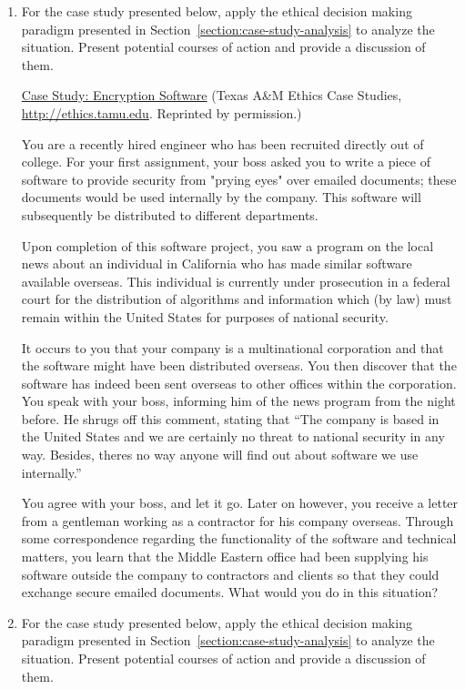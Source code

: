 \begin{enumerate}
\item
  For the case study presented below, apply the ethical decision making
  paradigm presented in Section~\ref{section:case-study-analysis} 
	to analyze the situation. Present
  potential courses of action and provide a discussion of them.



\begin{example}{\ul{Case Study: Encryption Software} (Texas A\&M Ethics Case Studies,
\url{http://ethics.tamu.edu}. Reprinted by permission.)}
\label{example:ethicsProblemsEncryptionSoftware}

You are a recently hired engineer who has been recruited directly out of
college. For your first assignment, your boss asked you to write a piece
of software to provide security from "prying eyes" over e­mailed
documents; these documents would be used internally by the company. This
software will subsequently be distributed to different departments.

Upon completion of this software project, you saw a program on the local
news about an individual in California who has made similar software
available overseas. This individual is currently under prosecution in a
federal court for the distribution of algorithms and information which
(by law) must remain within the United States for purposes of national
security.

It occurs to you that your company is a multinational corporation and
that the software might have been distributed overseas. You then
discover that the software has indeed been sent overseas to other
offices within the corporation. You speak with your boss, informing him
of the news program from the night before. He shrugs off this comment,
stating that ``The company is based in the United States and we are
certainly no threat to national security in any way. Besides,
there\textquotesingle s no way anyone will find out about software we
use internally.''

You agree with your boss, and let it go. Later on however, you receive a
letter from a gentleman working as a contractor for his company
overseas. Through some correspondence regarding the functionality of the
software and technical matters, you learn that the Middle Eastern office
had been supplying his software outside the company to contractors and
clients so that they could exchange secure e­mailed documents. What would
you do in this situation?
\end{example}


\item
  For the case study presented below, apply the ethical decision making
  paradigm presented in Section~\ref{section:case-study-analysis} 
to analyze the situation. Present
  potential courses of action and provide a discussion of them.


\end{enumerate}

